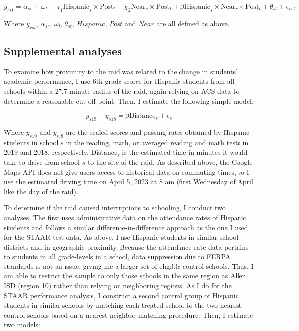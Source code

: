 \documentclass[hidelinks,twoside]{article}
\begin{document}
\begin{equation*}
       y_{rst} = \alpha_{sr} + \omega_{t} + \chi_{1}\text{Hispanic}_{s} \times \text{Post}_{t} + \chi_{2}\text{Near}_{s} \times \text{Post}_{t} + \beta \text{Hispanic}_{s} \times \text{Near}_r \times \text{Post}_{t} +  \theta_{st} + \epsilon_{rst}
    \end{equation*}


\noindent Where $y_{rst}$, $\alpha_{sr}$, $\omega_{t}$, $\theta_{st}$, $Hispanic$, $Post$ and $Near$ are all defined as above. 

\subsection*{Supplemental analyses}

To examine how proximity to the raid was related to the change in students’ academic performance, I use 6th grade scores for Hispanic students from all schools within a 27.7 minute radius of the raid, again relying on ACS data to determine a reasonable cut-off point. Then, I estimate the following simple model:

\begin{equation*}
       y_{s19} - y_{s18} = \beta \text{Distance}_s + \epsilon_{s}
    \end{equation*}

\noindent Where $y_{s19}$ and $y_{s18}$ are the scaled scores and passing rates obtained by Hispanic students in school $s$ in the reading, math, or averaged reading and math tests in 2019 and 2018, respectively. $\text{Distance}_s$ is the estimated time in minutes it would take to drive from school $s$ to the site of the raid. As described above, the Google Maps API does not give users access to historical data on commuting times, so I use the estimated driving time on April 5, 2023 at 8 am (first Wednesday of April like the day of the raid). 

To determine if the raid caused interruptions to schooling, I conduct two analyses. The first uses administrative data on the attendance rates of Hispanic students and follows a similar difference-in-difference approach as the one I used for the STAAR test data. As above, I use Hispanic students in similar school districts and in geographic proximity. Because the attendance rate data pertains to students in all grade-levels in a school, data suppression due to FERPA standards is not an issue, giving me a larger set of eligible control schools. Thus, I am able to restrict the sample to only those schools in the same region as Allen ISD (region 10) rather than relying on neighboring regions. As I do for the STAAR performance analysis, I construct a second control group of Hispanic students in similar schools by matching each treated school to the two nearest control schools based on a nearest-neighbor matching procedure. Then, I estimate two models:
\end{document}
